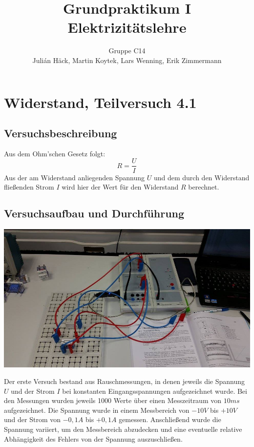 \documentclass[12pt,a4paper]{article}
\author{Gruppe C14 \\ Julián Häck, Martin Koytek, Lars Wenning, Erik Zimmermann}
\title{Grundpraktikum I \\ Elektrizitätslehre}
\begin{document}
\maketitle
\newpage
\tableofcontents
\newpage
\section{Widerstand, Teilversuch 4.1}
\subsection{Versuchsbeschreibung}
Aus dem Ohm'schen Gesetz folgt:
\[R=\frac{U}{I}\]
Aus der am Widerstand anliegenden Spannung $U$ und dem durch den Widerstand fließenden Strom $I$ wird hier der Wert für den Widerstand $R$ berechnet.
\subsection{Versuchsaufbau und Durchführung}
\begin{center}
\includegraphics[scale=0.35]{12000155_1207085929316467_1534534399_n.jpg}
\label{Versuchsaufbau_Widerstand}
\end{center}

Der erste Versuch bestand aus Rauschmessungen, in denen jeweils die Spannung $U$ und der Strom $I$ bei konstanten Eingangsspannungen aufgezeichnet wurde.
Bei den Messungen wurden jeweils 1000 Werte über einen Messzeitraum von $10ms$ aufgezeichnet. Die Spannung wurde in einem Messbereich von $-10V$ bis $+10V$ und der Strom von $-0,1A$ bis $+0,1A$ gemessen.
Anschließend wurde die Spannung variiert, um den Messbereich abzudecken und eine eventuelle relative Abhängigkeit des Fehlers von der Spannung auszuschließen. 
\end{document}
